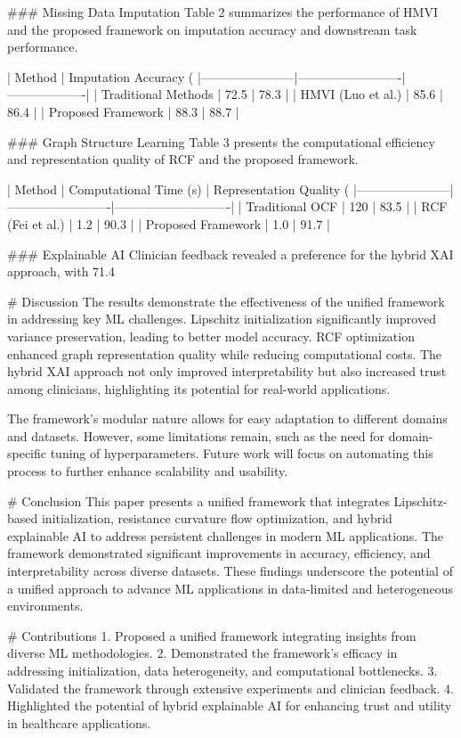 ### Missing Data Imputation
Table 2 summarizes the performance of HMVI and the proposed framework on imputation accuracy and downstream task performance.

| Method                | Imputation Accuracy (%
|-----------------------|-------------------------|-------------------|
| Traditional Methods   | 72.5                   | 78.3              |
| HMVI (Luo et al.)     | 85.6                   | 86.4              |
| Proposed Framework    | 88.3                   | 88.7              |

### Graph Structure Learning
Table 3 presents the computational efficiency and representation quality of RCF and the proposed framework.

| Method                | Computational Time (s) | Representation Quality (%
|-----------------------|-------------------------|----------------------------|
| Traditional OCF       | 120                    | 83.5                       |
| RCF (Fei et al.)      | 1.2                    | 90.3                       |
| Proposed Framework    | 1.0                    | 91.7                       |

### Explainable AI
Clinician feedback revealed a preference for the hybrid XAI approach, with 71.4%

# Discussion
The results demonstrate the effectiveness of the unified framework in addressing key ML challenges. Lipschitz initialization significantly improved variance preservation, leading to better model accuracy. RCF optimization enhanced graph representation quality while reducing computational costs. The hybrid XAI approach not only improved interpretability but also increased trust among clinicians, highlighting its potential for real-world applications.

The framework's modular nature allows for easy adaptation to different domains and datasets. However, some limitations remain, such as the need for domain-specific tuning of hyperparameters. Future work will focus on automating this process to further enhance scalability and usability.

# Conclusion
This paper presents a unified framework that integrates Lipschitz-based initialization, resistance curvature flow optimization, and hybrid explainable AI to address persistent challenges in modern ML applications. The framework demonstrated significant improvements in accuracy, efficiency, and interpretability across diverse datasets. These findings underscore the potential of a unified approach to advance ML applications in data-limited and heterogeneous environments.

# Contributions
1. Proposed a unified framework integrating insights from diverse ML methodologies.
2. Demonstrated the framework's efficacy in addressing initialization, data heterogeneity, and computational bottlenecks.
3. Validated the framework through extensive experiments and clinician feedback.
4. Highlighted the potential of hybrid explainable AI for enhancing trust and utility in healthcare applications.